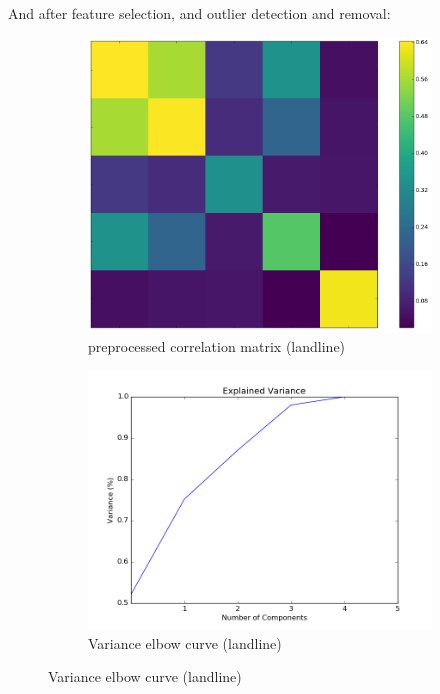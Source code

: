 \documentclass[20pt]{article} %
\begin{document}
And after feature selection, and outlier detection and removal:

\begin{figure}[!htbp]
  	\centering
   	\begin{subfigure}[p]{0.4\linewidth}
    	\includegraphics[width=\linewidth]{../figures/landline/trasnformed_corr.png}
	\caption{preprocessed correlation matrix (landline)}
   	\end{subfigure}
   	\begin{subfigure}[p]{0.4\linewidth}
    	\includegraphics[width=\linewidth]{../figures/landline/transformedelbow.png}
	\caption{Variance elbow curve (landline)}
   	\end{subfigure}
\end{figure} 
\end{document}
